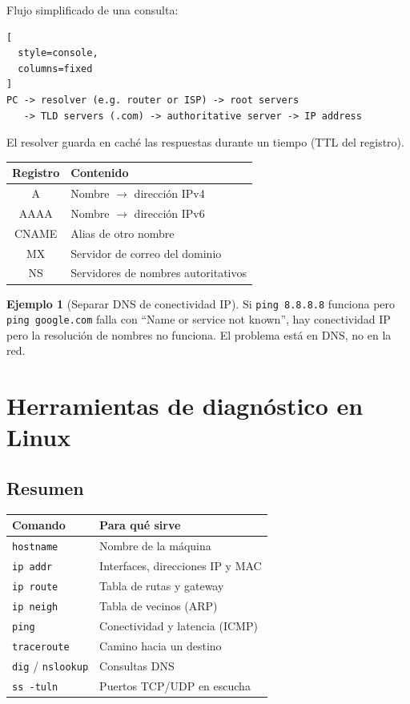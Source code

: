 \documentclass[11pt,a4paper]{article}
\theoremstyle{definition}
\newtheorem{ejemplo}{Ejemplo}[section]
\theoremstyle{remark}
\newcommand{\cmd}[1]{\texttt{#1}}
\begin{document}
Flujo simplificado de una consulta:

\begin{lstlisting}[
  style=console,
  columns=fixed
]
PC -> resolver (e.g. router or ISP) -> root servers
   -> TLD servers (.com) -> authoritative server -> IP address
\end{lstlisting}

El resolver guarda en caché las respuestas durante un tiempo (TTL del registro).

\begin{center}
\begin{tabular}{@{}cp{9cm}@{}}
\toprule
\textbf{Registro} & \textbf{Contenido}\\
\midrule
A & Nombre $\to$ dirección IPv4\\
AAAA & Nombre $\to$ dirección IPv6\\
CNAME & Alias de otro nombre\\
MX & Servidor de correo del dominio\\
NS & Servidores de nombres autoritativos\\
\bottomrule
\end{tabular}
\end{center}

\begin{ejemplo}[Separar DNS de conectividad IP]
Si \cmd{ping 8.8.8.8} funciona pero \cmd{ping google.com} falla con ``Name or service not known'', hay conectividad IP pero la resolución de nombres no funciona. El problema está en DNS, no en la red.
\end{ejemplo}

\section{Herramientas de diagnóstico en Linux}\label{sec:herramientas}

\subsection{Resumen}

\begin{center}
\begin{tabular}{@{}lp{9.5cm}@{}}
\toprule
\textbf{Comando} & \textbf{Para qué sirve}\\
\midrule
\cmd{hostname} & Nombre de la máquina\\
\cmd{ip addr} & Interfaces, direcciones IP y MAC\\
\cmd{ip route} & Tabla de rutas y gateway\\
\cmd{ip neigh} & Tabla de vecinos (ARP)\\
\cmd{ping} & Conectividad y latencia (ICMP)\\
\cmd{traceroute} & Camino hacia un destino\\
\cmd{dig} / \cmd{nslookup} & Consultas DNS\\
\cmd{ss -tuln} & Puertos TCP/UDP en escucha\\
\bottomrule
\end{tabular}
\end{center}
\end{document}
